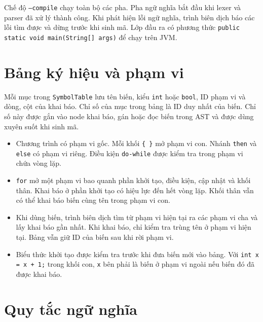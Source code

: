 \documentclass[11pt,a4paper]{article}
\newcommand{\tm}[1]{\texttt{\textcolor{upltok}{#1}}}
\begin{document}
Chế độ \texttt{--compile} chạy toàn bộ các pha. Pha ngữ nghĩa bắt đầu khi lexer
và parser đã xử lý thành công. Khi phát hiện lỗi ngữ nghĩa, trình biên dịch báo
các lỗi tìm được và dừng trước khi sinh mã. Lớp đầu ra có phương thức
\texttt{public static void main(String[] args)} để chạy trên JVM.

\section{Bảng ký hiệu và phạm vi}

Mỗi mục trong \texttt{SymbolTable} lưu tên biến, kiểu \tm{int} hoặc \tm{bool},
ID phạm vi và dòng, cột của khai báo. Chỉ số của mục trong bảng là ID duy nhất
của biến. Chỉ số này được gắn vào node khai báo, gán hoặc đọc biến trong AST
và được dùng xuyên suốt khi sinh mã.

\begin{itemize}
  \item Chương trình có phạm vi gốc. Mỗi khối \texttt{\{ \}} mở phạm vi con.
        Nhánh \tm{then} và \tm{else} có phạm vi riêng. Điều kiện
        \tm{do-while} được kiểm tra trong phạm vi chứa vòng lặp.
  \item \tm{for} mở một phạm vi bao quanh phần khởi tạo, điều kiện, cập nhật
        và khối thân. Khai báo ở phần khởi tạo có hiệu lực đến hết vòng lặp.
        Khối thân vẫn có thể khai báo biến cùng tên trong phạm vi con.
  \item Khi dùng biến, trình biên dịch tìm từ phạm vi hiện tại ra các phạm vi
        cha và lấy khai báo gần nhất. Khi khai báo, chỉ kiểm tra trùng tên ở
        phạm vi hiện tại. Bảng vẫn giữ ID của biến sau khi rời phạm vi.
  \item Biểu thức khởi tạo được kiểm tra trước khi đưa biến mới vào bảng.
        Với \texttt{int x = x + 1;} trong khối con, \texttt{x} bên phải
        là biến ở phạm vi ngoài nếu biến đó đã được khai báo.
\end{itemize}

\clearpage
\section{Quy tắc ngữ nghĩa}
\end{document}
